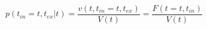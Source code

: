 \begin{equation}
p(t_{in}=t,t_{ex}|t)  = \frac{v(t,t_{in}=t,t_{ex})}{V(t)}= \frac{F(t=t,t_{in})}{V(t)}
\end{equation}\begin{equation}

\end{equation}